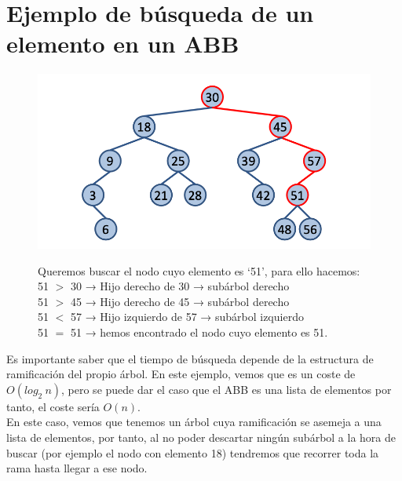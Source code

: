\section{Ejemplo de búsqueda de un elemento en un ABB}
\begin{figure}[h]
  \hspace{-0.5cm}
  \begin{minipage}{.45\textwidth}
    \includegraphics[width=\textwidth]{assets/Abb2.png}
  \end{minipage}
  \hspace{-0.5cm}
  \begin{minipage}{.5\textwidth}
  Queremos buscar el nodo cuyo elemento es `51', para ello hacemos:\\
  51 $>$ 30 → Hijo derecho de 30 → subárbol derecho\\
  51 $>$ 45 → Hijo derecho de 45 → subárbol derecho\\
  51 $<$ 57 → Hijo izquierdo de 57 → subárbol izquierdo\\
  51 $=$ 51 → hemos encontrado el nodo cuyo elemento es 51.
  \end{minipage}
\end{figure}
\newpage
\begin{minipage}{0.75\textwidth}
  Es importante saber que el tiempo de búsqueda depende de la estructura de ramificación del propio árbol. En este ejemplo, vemos que es un coste de \(O(log_{2}\ n)\), pero se puede dar el caso que el ABB es una lista de elementos por tanto, el coste sería \(O(n)\).
  \\

  En este caso, vemos que tenemos un árbol cuya ramificación se asemeja a una lista de elementos, por tanto, al no poder descartar ningún subárbol a la hora de buscar (por ejemplo el nodo con elemento 18) tendremos que recorrer toda la rama hasta llegar a ese nodo.
\end{minipage}
